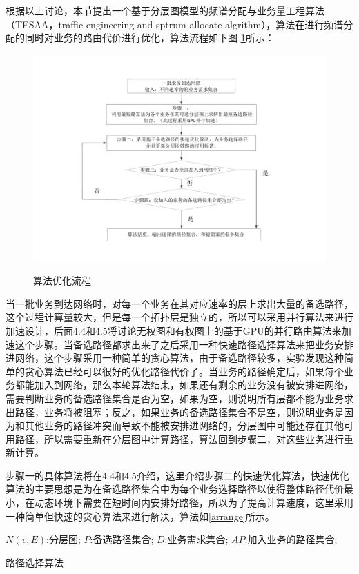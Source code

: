 根据以上讨论，本节提出一个基于分层图模型的频谱分配与业务量工程算法（TESAA，traffic engineering and sptrum allocate algrithm），算法在进行频谱分配的同时对业务的路由代价进行优化，算法流程如下图 \ref{bblayer}所示：
\begin{figure}
\setlength{\belowcaptionskip}{-0.5cm}
\begin{center}
{\includegraphics[width=1 \textwidth]{figures/bbprocess.pdf}}
\end{center}
\caption{{\footnotesize{算法优化流程}}}
\label{bblayer}
\end{figure}

当一批业务到达网络时，对每一个业务在其对应速率的层上求出大量的备选路径，这个过程计算量较大，但是每一个拓扑层是独立的，所以可以采用并行算法来进行加速设计，后面4.4和4.5将讨论无权图和有权图上的基于GPU的并行路由算法来加速这个步骤。当备选路径都求出来了之后采用一种快速路径选择算法来把业务安排进网络，这个步骤采用一种简单的贪心算法，由于备选路径较多，实验发现这种简单的贪心算法已经可以很好的优化路径代价了。当业务的路径确定后，如果每个业务都能加入到网络，那么本轮算法结束，如果还有剩余的业务没有被安排进网络，需要判断业务的备选路径集合是否为空，如果为空，则说明所有层都不能为业务求出路径，业务将被阻塞；反之，如果业务的备选路径集合不是空，则说明业务是因为和其他业务的路径冲突而导致不能被安排进网络的，分层图中可能还存在其他可用路径，所以需要重新在分层图中计算路径，算法回到步骤二，对这些业务进行重新计算。

步骤一的具体算法将在4.4和4.5介绍，这里介绍步骤二的快速优化算法，快速优化算法的主要思想是为在备选路径集合中为每个业务选择路径以使得整体路径代价最小，在动态环境下需要在短时间内安排好路径，所以为了提高计算速度，这里采用一种简单但快速的贪心算法来进行解决，算法如\ref{arrange}所示。
\begin{algorithm}[htb]
\begin{algorithmic}[1]
\Require
$N(v,E)$:分层图;
$P$:备选路径集合;
$D$:业务需求集合;
\Ensure
$AP$:加入业务的路径集合;
\EndFor
{}
\EndIf
\EndFor
\EndFor
\end{algorithmic}
\caption{路径选择算法}
\label{arrange}
\end{algorithm}

